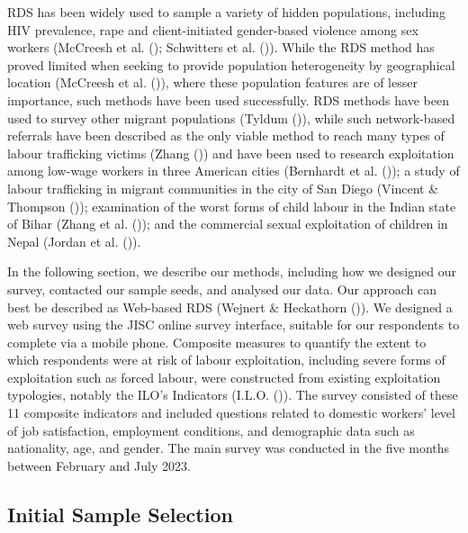 \documentclass[
  12pt,
]{article}
\theoremstyle{plain}
\theoremstyle{definition}
\begin{document}
RDS has been widely used to sample a variety of hidden populations,
including HIV prevalence, rape and client-initiated gender-based
violence among sex workers (McCreesh et al.
(); Schwitters et al.
()). While the RDS method
has proved limited when seeking to provide population heterogeneity by
geographical location (McCreesh et al.
()), where these population
features are of lesser importance, such methods have been used
successfully. RDS methods have been used to survey other migrant
populations (Tyldum ()), while
such network-based referrals have been described as the only viable
method to reach many types of labour trafficking victims (Zhang
()) and have been used to
research exploitation among low-wage workers in three American cities
(Bernhardt et al. ()); a study
of labour trafficking in migrant communities in the city of San Diego
(Vincent \& Thompson ());
examination of the worst forms of child labour in the Indian state of
Bihar (Zhang et al. ()); and the
commercial sexual exploitation of children in Nepal (Jordan et al.
()).

In the following section, we describe our methods, including how we
designed our survey, contacted our sample seeds, and analysed our data.
Our approach can best be described as Web-based RDS (Wejnert \&
Heckathorn ()). We designed a
web survey using the JISC online survey interface, suitable for our
respondents to complete via a mobile phone. Composite measures to
quantify the extent to which respondents were at risk of labour
exploitation, including severe forms of exploitation such as forced
labour, were constructed from existing exploitation typologies, notably
the ILO's Indicators (I.L.O. ()).
The survey consisted of these 11 composite indicators and included
questions related to domestic workers' level of job satisfaction,
employment conditions, and demographic data such as nationality, age,
and gender. The main survey was conducted in the five months between
February and July 2023.

\subsection{Initial Sample Selection}\label{initial-sample-selection}
\end{document}
